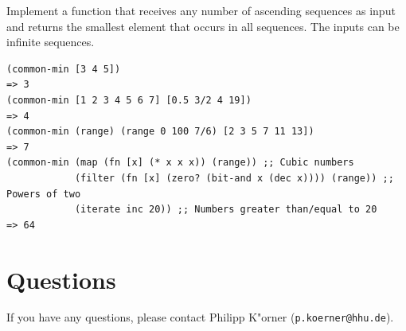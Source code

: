 \documentclass[11pt,a4paper]{article}
\begin{document}
\begin{exercise}

Implement a function that receives any number of ascending sequences
as input and returns the smallest element that occurs in all sequences.
The inputs can be infinite sequences.

\begin{verbatim}
(common-min [3 4 5])
=> 3
(common-min [1 2 3 4 5 6 7] [0.5 3/2 4 19])
=> 4
(common-min (range) (range 0 100 7/6) [2 3 5 7 11 13])
=> 7
(common-min (map (fn [x] (* x x x)) (range)) ;; Cubic numbers
            (filter (fn [x] (zero? (bit-and x (dec x)))) (range)) ;; Powers of two
            (iterate inc 20)) ;; Numbers greater than/equal to 20
=> 64
\end{verbatim}

\end{exercise}

\section*{Questions}
If you have any questions, please contact Philipp K"orner (\texttt{p.koerner@hhu.de}).
\end{document}
